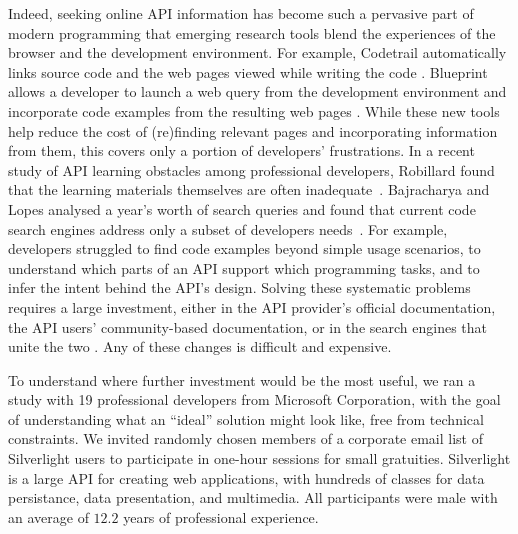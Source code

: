 Indeed, seeking online API information has become such a pervasive part of modern programming that emerging research tools blend the experiences of the browser and the development environment. For example, Codetrail automatically links source code and the web pages viewed while writing the code \cite{gm09}. Blueprint allows a developer to launch a web query from the development environment and incorporate code examples from the resulting web pages \cite{bdwk10}. While these new tools help reduce the cost of (re)finding relevant pages and incorporating information from them, this covers only a portion of developers' frustrations. 
%
In a recent study of API learning obstacles among professional developers, Robillard found that the learning materials themselves are often inadequate~\cite{robillard09}. Bajracharya and Lopes analysed a year's worth of search queries and found that current code search engines address only a subset of developers needs~\cite{Bajracharya2009a}.   
For example, developers struggled to find code examples beyond simple usage scenarios, to understand which parts of an API support which programming tasks, and to infer the intent behind the API's design. 
Solving these systematic problems requires a large investment, either in the API provider's official documentation, the API users' community-based documentation, or in the search engines that unite the two \cite{bdwk10,Hoffmann2007a}. 
Any of these changes is difficult and expensive.


To understand where further investment would be the most useful, we ran a study with 19 professional developers from Microsoft Corporation, with the goal of understanding what an ``ideal'' solution might look like, free from technical constraints. We invited randomly chosen members of a corporate email list of  Silverlight users to participate in one-hour sessions for small gratuities. Silverlight is a large API for creating web applications, with hundreds of classes for data persistance, data presentation, and multimedia. All participants were male with an average of $12.2$ years of professional experience. 

